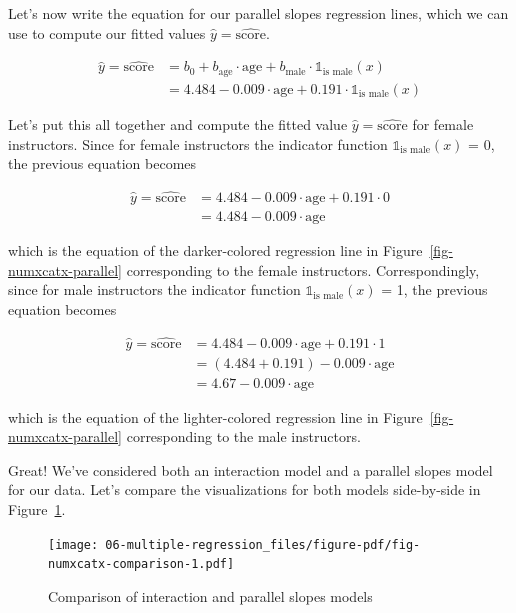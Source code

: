 \documentclass[
  letterpaper,
  DIV=11,
  numbers=noendperiod]{scrreprt}
\theoremstyle{definition}
\theoremstyle{remark}
\begin{document}
Let's now write the equation for our parallel slopes regression lines,
which we can use to compute our fitted values
\(\widehat{y} = \widehat{\text{score}}\).

\[
\begin{aligned}
\widehat{y} = \widehat{\text{score}} &= b_0 + b_{\mbox{age}} \cdot \mbox{age} + b_{\mbox{male}} \cdot \mathbb{1}_{\mbox{is male}}(x)\\
&= 4.484 -0.009 \cdot \mbox{age} + 0.191 \cdot \mathbb{1}_{\mbox{is male}}(x) 
\end{aligned}
\]

Let's put this all together and compute the fitted value
\(\widehat{y} = \widehat{\text{score}}\) for female instructors. Since
for female instructors the indicator function
\(\mathbb{1}_{\mbox{is male}}(x)\) = 0, the previous equation becomes

\[
\begin{aligned}
\widehat{y} = \widehat{\text{score}} &= 4.484 -0.009    \cdot \mbox{age} + 0.191 \cdot 0\\
&= 4.484 -0.009 \cdot \mbox{age}
\end{aligned}
\]

which is the equation of the darker-colored regression line in
Figure~\ref{fig-numxcatx-parallel} corresponding to the female
instructors. Correspondingly, since for male instructors the indicator
function \(\mathbb{1}_{\mbox{is male}}(x)\) = 1, the previous equation
becomes

\[
\begin{aligned}
\widehat{y} = \widehat{\text{score}} &= 4.484 -0.009    \cdot \mbox{age} + 0.191 \cdot 1\\
&= (4.484 + 0.191) - 0.009 \cdot \mbox{age}\\
&= 4.67 -0.009 \cdot \mbox{age}
\end{aligned}
\]

which is the equation of the lighter-colored regression line in
Figure~\ref{fig-numxcatx-parallel} corresponding to the male
instructors.

Great! We've considered both an interaction model and a parallel slopes
model for our data. Let's compare the visualizations for both models
side-by-side in Figure~\ref{fig-numxcatx-comparison}.

\begin{figure}

{\centering \texttt{[image: 06-multiple-regression\_files/figure-pdf/fig-numxcatx-comparison-1.pdf]}

}

\caption{\label{fig-numxcatx-comparison}Comparison of interaction and
parallel slopes models}

\end{figure}
\end{document}
